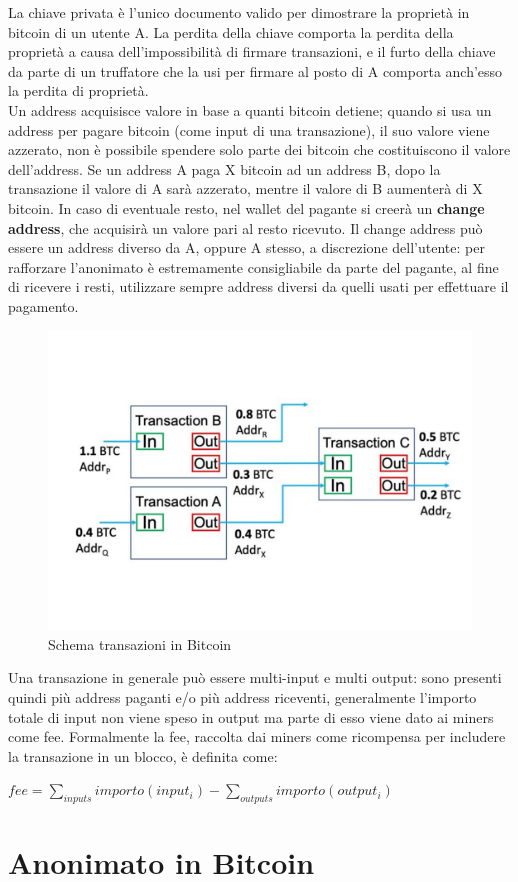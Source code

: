 La chiave privata è l’unico documento valido per dimostrare la proprietà in bitcoin di un utente A.
La perdita della chiave comporta la perdita della proprietà a causa dell’impossibilità di ﬁrmare transazioni, e il furto della chiave da parte di un truﬀatore che la usi per ﬁrmare al posto di A comporta anch’esso la perdita di proprietà.\\Un address acquisisce valore in base a quanti bitcoin detiene; quando si usa un address per pagare bitcoin (come input di una transazione), il suo valore viene azzerato, non è possibile spendere solo parte dei bitcoin che costituiscono il valore dell’address. Se un address A paga X bitcoin ad un address B, dopo la transazione il valore di A sarà azzerato, mentre il valore di B aumenterà di X bitcoin. In caso di eventuale resto, nel wallet del pagante si creerà un \textbf{change address}, che acquisirà un valore pari al resto ricevuto. Il change address può essere un address diverso da A, oppure A stesso, a discrezione dell’utente: per rafforzare l’anonimato è estremamente consigliabile da parte del pagante, al fine di ricevere i resti, utilizzare sempre address diversi da quelli usati per effettuare il pagamento.
\begin{figure}[h!]
    \centering
    \includegraphics[scale=0.4, trim = 1cm 2cm 0cm 3cm, clip]{Images/Transactions-input-and-output-in-blockchain.jpg.pdf}
    \caption{Schema transazioni in Bitcoin}
    \label{fig:transaction}
\end{figure}
\FloatBarrier
Una transazione in generale può essere multi-input e multi output: sono presenti quindi più address paganti e/o più address riceventi, generalmente l'importo totale di input non viene speso in output ma parte di esso viene dato ai miners come fee. Formalmente la fee, raccolta dai miners come ricompensa per includere la transazione in un blocco, è definita come:
\begin{center}
    $fee = \sum_{inputs} importo(input_i) - \sum_{outputs} importo(output_i)$
\end{center}
\section{Anonimato in Bitcoin}


